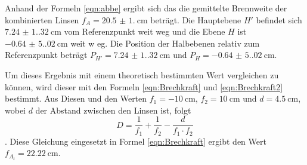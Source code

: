 Anhand der Formeln \ref{eqn:abbe} ergibt sich das die gemittelte Brennweite der kombinierten Linsen $f_A=\qty{20.5(1.0)}{\centi\meter}$ beträgt. Die Hauptebene $H'$ befindet sich $\qty{7.24(1.32)}{\centi\meter}$ vom Referenzpunkt
weit weg und die Ebene $H$ ist $\qty{-0.64(5.02)}{\centi\meter}$ weit w eg.
Die Position der Halbebenen relativ zum Referenzpunkt beträgt $P_{H'}=\qty{7.24(1.32)}{\centi\meter}$  und $P_H=\qty{-0.64(5.02)}{\centi\meter}$.

Um dieses Ergebnis mit einem theoretisch bestimmten Wert vergleichen zu können, wird dieser mit den Formeln \ref{eqn:Brechkraft} und \ref{eqn:Brechkraft2} bestimmt.
Aus Diesen und den Werten $f_1=\qty{-10}{\centi\meter}$, $f_2=\qty{10}{\centi\meter}$ und $d=\qty{4.5}{\centi\meter}$, wobei $d$ der Abstand zwischen den Linsen ist, folgt
\begin{equation*}
  D=\frac{1}{f_1}+\frac{1}{f_2}-\frac{d}{f_1 \cdot f_2}
\end{equation*} 
.
Diese Gleichung eingesetzt in Formel \ref{eqn:Brechkraft} ergibt den Wert $f_{A_t}=\qty{22.22}{\centi\meter}$.
